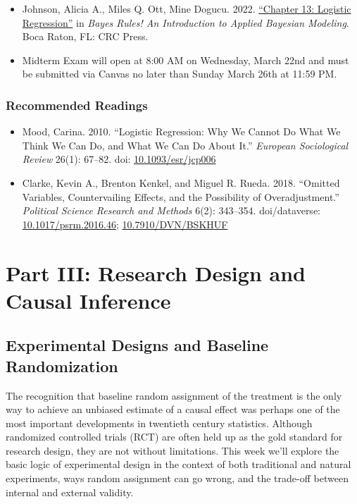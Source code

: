 \documentclass[12pt,]{article}
\begin{document}
\begin{itemize}
\item
  Johnson, Alicia A., Miles Q. Ott, Mine Dogucu. 2022.
  \href{https://www.bayesrulesbook.com/chapter-13.html}{``Chapter 13:
  Logistic Regression''} in \emph{Bayes Rules! An Introduction to
  Applied Bayesian Modeling}. Boca Raton, FL: CRC Press.
\item
  Midterm Exam will open at 8:00 AM on Wednesday, March 22nd and must be
  submitted via Canvas no later than Sunday March 26th at 11:59 PM.
\end{itemize}

\hypertarget{recommended-readings-6}{%
\subsubsection{Recommended Readings}\label{recommended-readings-6}}

\begin{itemize}
\item
  Mood, Carina. 2010. ``Logistic Regression: Why We Cannot Do What We
  Think We Can Do, and What We Can Do About It.'' \emph{European
  Sociological Review} 26(1): 67--82. doi:
  \href{https://doi.org/10.1093/esr/jcp006}{10.1093/esr/jcp006}
\item
  Clarke, Kevin A., Brenton Kenkel, and Miguel R. Rueda. 2018. ``Omitted
  Variables, Countervailing Effects, and the Possibility of
  Overadjustment.'' \emph{Political Science Research and Methods} 6(2):
  343--354. doi/dataverse:
  \href{https://doi.org/10.1017/psrm.2016.46}{10.1017/psrm.2016.46};
  \href{https://doi.org/10.7910/DVN/BSKHUF}{10.7910/DVN/BSKHUF}
\end{itemize}

\hypertarget{part-iii-research-design-and-causal-inference}{%
\section{Part III: Research Design and Causal
Inference}\label{part-iii-research-design-and-causal-inference}}

\hypertarget{experimental-designs-and-baseline-randomization}{%
\subsection{Experimental Designs and Baseline
Randomization}\label{experimental-designs-and-baseline-randomization}}

\noindent The recognition that baseline random assignment of the
treatment is the only way to achieve an unbiased estimate of a causal
effect was perhaps one of the most important developments in twentieth
century statistics. Although randomized controlled trials (RCT) are
often held up as the gold standard for research design, they are not
without limitations. This week we'll explore the basic logic of
experimental design in the context of both traditional and natural
experiments, ways random assignment can go wrong, and the trade-off
between internal and external validity.
\end{document}

